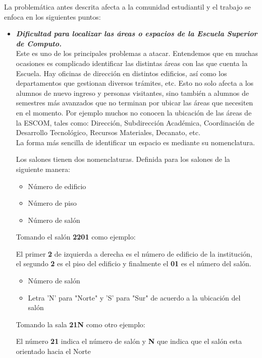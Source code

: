 	La problemática antes descrita afecta a la comunidad estudiantil y el trabajo se enfoca en los siguientes puntos:
	\begin{itemize}
		\item \textbf{\textit{Dificultad para localizar las áreas o espacios de la Escuela Superior de Computo.}}\\
		
		Este es uno de los principales problemas a atacar. Entendemos que en muchas ocasiones es complicado identificar las distintas áreas con las que cuenta la Escuela. Hay oficinas de dirección en distintos edificios, así como los departamentos que gestionan diversos trámites, etc. Esto no solo afecta a los alumnos de nuevo ingreso y personas visitantes, sino también a alumnos de semestres más avanzados que no terminan por ubicar las áreas que necesiten en el momento. Por ejemplo muchos no conocen la ubicación de las áreas de la ESCOM, tales como: Dirección, Subdirección Académica, Coordinación de Desarrollo Tecnológico, Recursos Materiales, Decanato, etc.\\ 
		
		
		La forma más sencilla de identificar un espacio es mediante su nomenclatura.
		
		Los salones tienen dos nomenclaturas. Definida para los salones de la siguiente manera:
		\begin{itemize}
			\item Número de edificio
			\item Número de piso
			\item Número de salón
		\end{itemize}
		
		Tomando el salón \textbf{2201} como ejemplo:
		
		El primer \textbf{2} de izquierda a derecha es el número de edificio de la institución, el segundo \textbf{2} es el piso del edificio y finalmente el \textbf{01} es el número del salón.\\
		
		\begin{itemize}
			\item Número de salón
			\item Letra 'N' para "Norte"  y  'S' para "Sur" de acuerdo a  la ubicación del salón
		\end{itemize}
		
		Tomando la sala \textbf{21N} como otro ejemplo: 
		
		El número \textbf{21} indica el número de salón y \textbf{N} que indica que el salón esta orientado hacia el Norte\\
		

\end{itemize}
